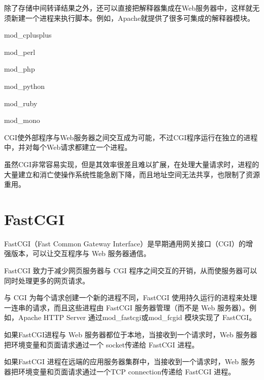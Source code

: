 除了存储中间转译结果之外，还可以直接把解释器集成在Web服务器中，这样就无须新建一个进程来执行脚本。例如，Apache就提供了很多可集成的解释器模块。

\begin{compactitem}
\item mod\_cplusplus
\item mod\_perl
\item mod\_php
\item mod\_python
\item mod\_ruby
\item mod\_mono
\end{compactitem}


CGI使外部程序与Web服务器之间交互成为可能，不过CGI程序运行在独立的进程中，并对每个Web请求都建立一个进程。

虽然CGI非常容易实现，但是其效率很差且难以扩展，在处理大量请求时，进程的大量建立和消亡使操作系统性能急剧下降，而且地址空间无法共享，也限制了资源重用。


\section{FastCGI}





FastCGI（Fast Common Gateway Interface）是早期通用网关接口（CGI）的增强版本，可以让交互程序与 Web 服务器通信。

FastCGI 致力于减少网页服务器与 CGI 程序之间交互的开销，从而使服务器可以同时处理更多的网页请求。


与 CGI 为每个请求创建一个新的进程不同，FastCGI 使用持久运行的进程来处理一连串的请求，而且这些进程由 FastCGI 服务器管理（而不是 Web 服务器）。例如，Apache HTTP Server 通过mod\_fastcgi或mod\_fcgid 模块实现了 FastCGI。

\begin{compactitem}
\item 如果FastCGI进程与 Web 服务器都位于本地，当接收到一个请求时，Web 服务器把环境变量和页面请求通过一个 socket传递给 FastCGI 进程。
\item  如果FastCGI 进程在远端的应用服务器集群中，当接收到一个请求时，Web 服务器把环境变量和页面请求通过一个TCP connection传递给 FastCGI 进程。
\end{compactitem}


